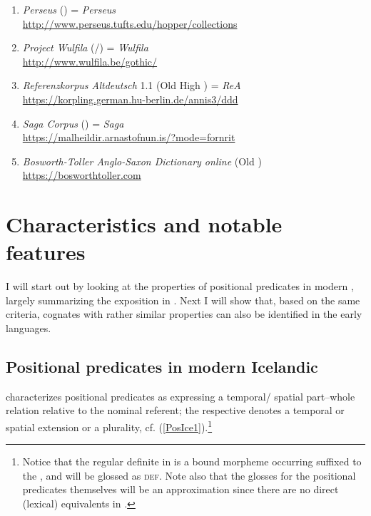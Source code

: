 \documentclass[output=paper,colorlinks,citecolor=brown]{langscibook}
\begin{document}
\begin{enumerate} 
    \item \textit{Perseus} () \hfill = \textit{Perseus} \\
    \url{http://www.perseus.tufts.edu/hopper/collections}
    \item \textit{Project Wulfila} (/) \hfill = \textit{Wulfila} \\ 
    \url{http://www.wulfila.be/gothic/}
    \item \textit{Referenzkorpus Altdeutsch} 1.1 (Old High ) \hfill = \textit{ReA} \\ 
    \url{https://korpling.german.hu-berlin.de/annis3/ddd}
    \item \textit{Saga Corpus} () \hfill = \textit{Saga} \\ 
    \url{https://malheildir.arnastofnun.is/?mode=fornrit}
    \item \textit{Bosworth-Toller Anglo-Saxon Dictionary online} (Old )  \\ \url{https://bosworthtoller.com}
\end{enumerate}





\section{Characteristics and notable features}
\label{sec:10:PosPrr}

I will start out by looking at the properties of positional predicates in modern , largely summarizing the exposition in \citet{Pfaff2015,Pfaff2017}. Next I will show that, based on the same criteria, cognates with rather similar properties can also be identified in the early  languages.


\subsection{Positional predicates in modern Icelandic}
\label{sec:10:posprICE}

\citet{Pfaff2015,Pfaff2017} characterizes positional predicates as expressing a temporal/ spatial part--whole relation relative to the nominal referent; the respective  denotes a temporal or spatial extension or a plurality, cf. (\ref{PosIce1}).\footnote{\label{fnPos}Notice that the regular definite  in  is a bound morpheme occurring suffixed to the , and will be glossed as \textsc{def}.  Note also that the glosses for the positional predicates themselves will be an approximation since there are no direct (lexical) equivalents in . }
\end{document}
